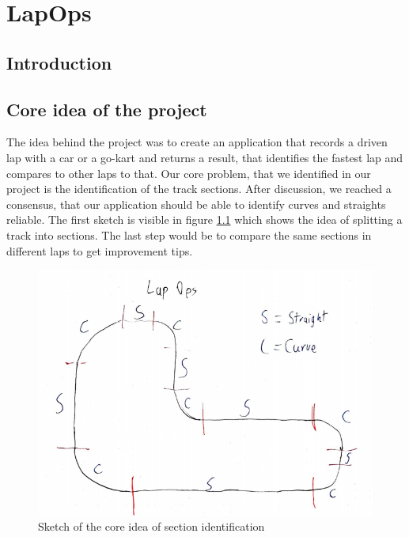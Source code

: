 \chapter{LapOps}


\section{Introduction}

\section{Core idea of the project}
The idea behind the project was to create an application that records a driven lap with a car or a go-kart and returns a result, that identifies the fastest lap and compares to other laps to that. Our core problem, that we identified in our project is the identification of the track sections. After discussion, we reached a consensus, that our application should be able to identify curves and straights reliable. The first sketch is visible in figure \ref{sketchLapOps} which shows the idea of splitting a track into sections. The last step would be to compare the same sections in different laps to get improvement tips.

\begin{figure}[H]
	\centering
	\includegraphics[scale= 0.6]{Pictures/LapOpsSkizze.png}
	\caption{Sketch of the core idea of section identification}
	\label{sketchLapOps}
\end{figure}
